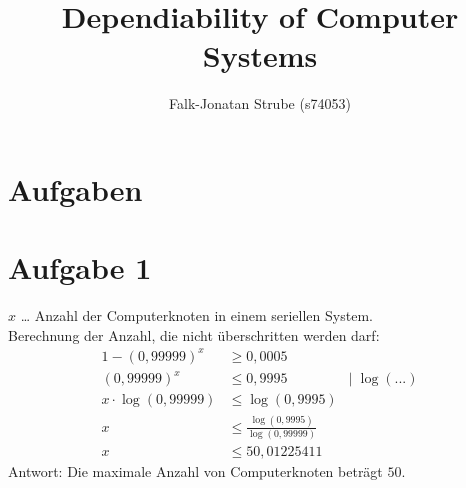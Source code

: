 \documentclass{scrartcl}
\title{Dependiability of Computer Systems}
\author{Falk-Jonatan Strube (s74053)}
\begin{document}
\maketitle
\tableofcontents

\section*{Aufgaben}
\begin{center}
\end{center}

\section{Aufgabe 1}
$x$ … Anzahl der Computerknoten in einem seriellen System.\\
Berechnung der Anzahl, die nicht überschritten werden darf:
\begin{align*}
1-(0,99999)^x &\geq 0,0005\\
(0,99999)^x &\leq 0,9995 &|\; \log(...)\\
x\cdot \log(0,99999) &\leq \log(0,9995)\\
x &\leq \frac{\log(0,9995)}{\log(0,99999)}\\
x &\leq 50,01225411
\end{align*}
Antwort: Die maximale Anzahl von Computerknoten beträgt $50$.
\end{document}
